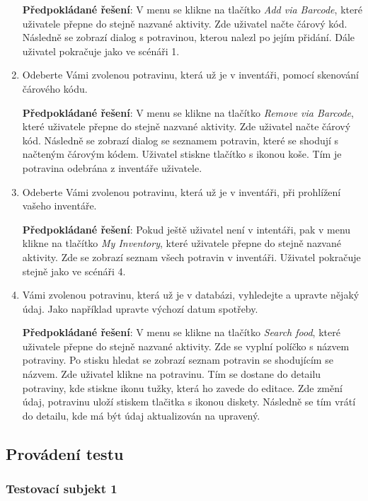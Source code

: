 \documentclass[thesis=B,czech]{FITthesis}[2013/10/20]
\begin{document}
\begin{enumerate}
    \textbf{Předpokládané řešení}: V menu se klikne na tlačítko \textit{Add via Barcode}, které uživatele přepne do stejně nazvané aktivity. Zde uživatel načte čárový kód. Následně se zobrazí dialog s potravinou, kterou nalezl po jejím přidání. Dále uživatel pokračuje jako ve scénáři 1.
  
  \item Odeberte Vámi zvolenou potravinu, která už je v inventáři, pomocí skenování čárového kódu.
    
    \textbf{Předpokládané řešení}: V menu se klikne na tlačítko \textit{Remove via Barcode}, které uživatele přepne do stejně nazvané aktivity. Zde uživatel načte čárový kód. Následně se zobrazí dialog se seznamem potravin, které se shodují s načteným čárovým kódem. Uživatel stiskne tlačítko s ikonou koše. Tím je potravina odebrána z inventáře uživatele.
  
  \item Odeberte Vámi zvolenou potravinu, která už je v inventáři, při prohlížení vašeho inventáře.
    
    \textbf{Předpokládané řešení}: Pokud ještě uživatel není v intentáři, pak v menu klikne na tlačítko \textit{My Inventory}, které uživatele přepne do stejně nazvané aktivity. Zde se zobrazí seznam všech potravin v inventáři. Uživatel pokračuje stejně jako ve scénáři 4.
  
  \item Vámi zvolenou potravinu, která už je v databázi, vyhledejte a upravte nějaký údaj. Jako například upravte výchozí datum spotřeby.
    
    \textbf{Předpokládané řešení}: V menu se klikne na tlačítko \textit{Search food}, které uživatele přepne do stejně nazvané aktivity. Zde se vyplní políčko s názvem potraviny. Po stisku hledat se zobrazí seznam potravin se shodujícím se názvem. Zde uživatel klikne na potravinu. Tím se dostane do detailu potraviny, kde stiskne ikonu tužky, která ho zavede do editace. Zde změní údaj, potravinu uloží stiskem tlačitka s ikonou diskety. Následně se tím vrátí do detailu, kde má být údaj aktualizován na upravený.
  
\end{enumerate}

\subsection{Provádení testu}

\subsubsection{Testovací subjekt 1}
\end{document}
